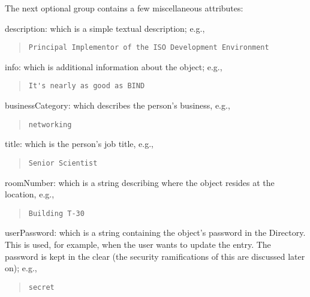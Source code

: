 The next optional group contains a few miscellaneous attributes:
\begin{describe}
\item[description:]
			which is a simple textual description;
			e.g.,
\begin{quote}\small\begin{verbatim}
Principal Implementor of the ISO Development Environment
\end{verbatim}\end{quote}

\item[info:]
			which is additional information about the object;
			e.g.,
\begin{quote}\small\begin{verbatim}
It's nearly as good as BIND
\end{verbatim}\end{quote}

\item[businessCategory:]
			which describes the person's business,
			e.g.,
\begin{quote}\small\begin{verbatim}
networking
\end{verbatim}\end{quote}

\item[title:]
			which is the person's job title,
			e.g.,
\begin{quote}\small\begin{verbatim}
Senior Scientist
\end{verbatim}\end{quote}

\item[roomNumber:]
			which is a string describing where the object resides
			at the location, e.g.,
\begin{quote}\small\begin{verbatim}
Building T-30
\end{verbatim}\end{quote}

\item[userPassword:]
			which is a string containing the object's
			password in the Directory.  This is used,
			for example, when the user wants to update
			the entry.
			The password is kept in the clear
			(the security ramifications of this are
			discussed later on); e.g.,
\begin{quote}\small\begin{verbatim}
secret
\end{verbatim}\end{quote}


\end{describe}
